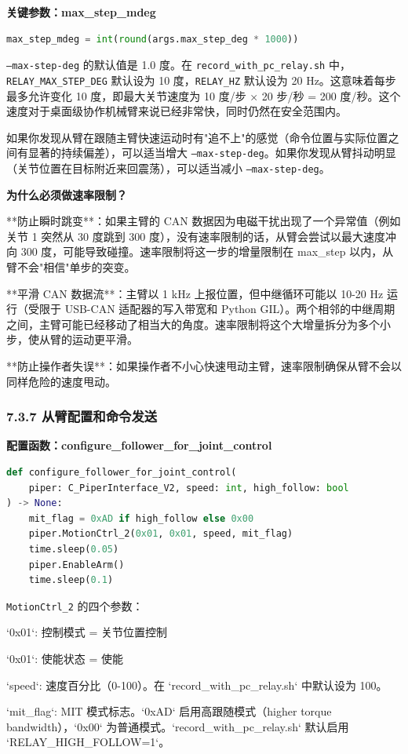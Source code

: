 \documentclass[UTF8,a4paper,11pt]{ctexart}
\begin{document}
{\textbf{关键参数：max_step_mdeg}

\begin{lstlisting}[language=python]
max_step_mdeg = int(round(args.max_step_deg * 1000))
\end{lstlisting}

\texttt{--max-step-deg} 的默认值是 1.0 度。在 \texttt{record_with_pc_relay.sh} 中，\texttt{RELAY_MAX_STEP_DEG} 默认设为 10 度，\texttt{RELAY_HZ} 默认设为 20 Hz。这意味着每步最多允许变化 10 度，即最大关节速度为 10 度/步 × 20 步/秒 = 200 度/秒。这个速度对于桌面级协作机械臂来说已经非常快，同时仍然在安全范围内。

如果你发现从臂在跟随主臂快速运动时有"追不上"的感觉（命令位置与实际位置之间有显著的持续偏差），可以适当增大 \texttt{--max-step-deg}。如果你发现从臂抖动明显（关节位置在目标附近来回震荡），可以适当减小 \texttt{--max-step-deg}。

\textbf{为什么必须做速率限制？}

\item[1] **防止瞬时跳变**：如果主臂的 CAN 数据因为电磁干扰出现了一个异常值（例如关节 1 突然从 30 度跳到 300 度），没有速率限制的话，从臂会尝试以最大速度冲向 300 度，可能导致碰撞。速率限制将这一步的增量限制在 max_step 以内，从臂不会"相信"单步的突变。
\item[2] **平滑 CAN 数据流**：主臂以 1 kHz 上报位置，但中继循环可能以 10-20 Hz 运行（受限于 USB-CAN 适配器的写入带宽和 Python GIL）。两个相邻的中继周期之间，主臂可能已经移动了相当大的角度。速率限制将这个大增量拆分为多个小步，使从臂的运动更平滑。
\item[3] **防止操作者失误**：如果操作者不小心快速甩动主臂，速率限制确保从臂不会以同样危险的速度甩动。

\subsubsection{7.3.7 从臂配置和命令发送}

\textbf{配置函数：configure_follower_for_joint_control}

\begin{lstlisting}[language=python]
def configure_follower_for_joint_control(
    piper: C_PiperInterface_V2, speed: int, high_follow: bool
) -> None:
    mit_flag = 0xAD if high_follow else 0x00
    piper.MotionCtrl_2(0x01, 0x01, speed, mit_flag)
    time.sleep(0.05)
    piper.EnableArm()
    time.sleep(0.1)
\end{lstlisting}

\texttt{MotionCtrl_2} 的四个参数：
\item `0x01`: 控制模式 = 关节位置控制
\item `0x01`: 使能状态 = 使能
\item `speed`: 速度百分比（0-100）。在 `record_with_pc_relay.sh` 中默认设为 100。
\item `mit_flag`: MIT 模式标志。`0xAD` 启用高跟随模式（higher torque bandwidth），`0x00` 为普通模式。`record_with_pc_relay.sh` 默认启用 `RELAY_HIGH_FOLLOW=1`。

}
\end{document}

